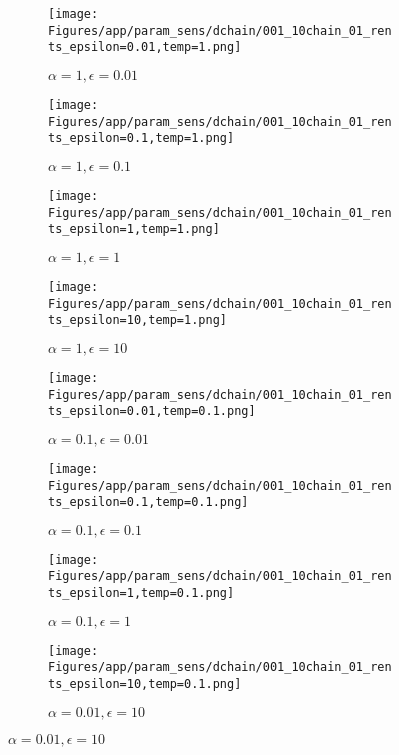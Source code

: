 \documentclass{article}
\theoremstyle{plain}
\begin{document}
\begin{appendices}
\begin{figure}
                \begin{subfigure}[b]{0.24\textwidth}
                    \centering
                    \texttt{[image: Figures/app/param\_sens/dchain/001\_10chain\_01\_rents\_epsilon=0.01,temp=1.png]}
                    \caption*{$\alpha=1,\epsilon=0.01$}
                \end{subfigure}
                \begin{subfigure}[b]{0.24\textwidth}
                    \centering
                    \texttt{[image: Figures/app/param\_sens/dchain/001\_10chain\_01\_rents\_epsilon=0.1,temp=1.png]}
                    \caption*{$\alpha=1,\epsilon=0.1$}
                \end{subfigure}
                \begin{subfigure}[b]{0.24\textwidth}
                    \centering
                    \texttt{[image: Figures/app/param\_sens/dchain/001\_10chain\_01\_rents\_epsilon=1,temp=1.png]}
                    \caption*{$\alpha=1,\epsilon=1$}
                \end{subfigure}
                \begin{subfigure}[b]{0.24\textwidth}
                    \centering
                    \texttt{[image: Figures/app/param\_sens/dchain/001\_10chain\_01\_rents\_epsilon=10,temp=1.png]}
                    \caption*{$\alpha=1,\epsilon=10$}
                \end{subfigure}
                
                \begin{subfigure}[b]{0.24\textwidth}
                    \centering
                    \texttt{[image: Figures/app/param\_sens/dchain/001\_10chain\_01\_rents\_epsilon=0.01,temp=0.1.png]}
                    \caption*{$\alpha=0.1,\epsilon=0.01$}
                \end{subfigure}
                \begin{subfigure}[b]{0.24\textwidth}
                    \centering
                    \texttt{[image: Figures/app/param\_sens/dchain/001\_10chain\_01\_rents\_epsilon=0.1,temp=0.1.png]}
                    \caption*{$\alpha=0.1,\epsilon=0.1$}
                \end{subfigure}
                \begin{subfigure}[b]{0.24\textwidth}
                    \centering
                    \texttt{[image: Figures/app/param\_sens/dchain/001\_10chain\_01\_rents\_epsilon=1,temp=0.1.png]}
                    \caption*{$\alpha=0.1,\epsilon=1$}
                \end{subfigure}
                \begin{subfigure}[b]{0.24\textwidth}
                    \centering
                    \texttt{[image: Figures/app/param\_sens/dchain/001\_10chain\_01\_rents\_epsilon=10,temp=0.1.png]}
                    \caption*{$\alpha=0.01,\epsilon=10$}
                \end{subfigure}
                

\end{figure}
\end{appendices}
\end{document}
